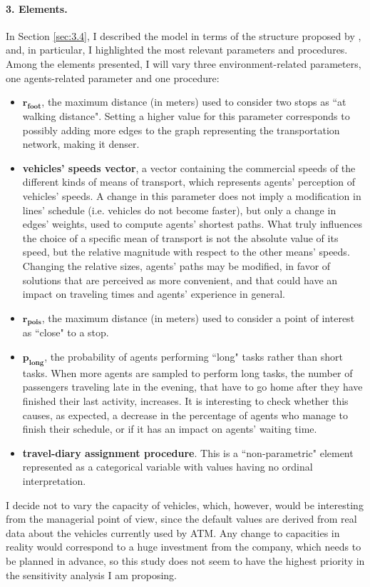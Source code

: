 \paragraph{3. Elements.}
In Section \ref{sec:3.4}, I described the model in terms of the structure proposed by \textcite{Borgonovo2022SensitivityAO}, and, in particular, I highlighted the most relevant parameters and procedures. Among the elements presented, I will vary three environment-related parameters, one agents-related parameter and one procedure:
\begin{itemize}
    \item $\mathbf{r_{foot}}$, the maximum distance (in meters) used to consider two stops as ``at walking distance". Setting a higher value for this parameter corresponds to possibly adding more edges to the graph representing the transportation network, making it denser.
    \item \textbf{vehicles' speeds vector}, a vector containing the commercial speeds of the different kinds of means of transport, which represents agents' perception of vehicles' speeds. A change in this parameter does not imply a modification in lines' schedule (i.e. vehicles do not become faster), but only a change in edges' weights, used to compute agents' shortest paths. What truly influences the choice of a specific mean of transport is not the absolute value of its speed, but the relative magnitude with respect to the other means' speeds. Changing the relative sizes, agents' paths may be modified, in favor of solutions that are perceived as more convenient, and that could have an impact on traveling times and agents' experience in general.
    \item $\mathbf{r_{pois}}$, the maximum distance (in meters) used to consider a point of interest as ``close" to a stop. 
    \item $\mathbf{p_{long}}$, the probability of agents performing ``long" tasks rather than short tasks. When more agents are sampled to perform long tasks, the number of passengers traveling late in the evening, that have to go home after they have finished their last activity, increases. It is interesting to check whether this causes, as expected, a decrease in the percentage of agents who manage to finish their schedule, or if it has an impact on agents' waiting time.
    \item \textbf{travel-diary assignment procedure}. This is a ``non-parametric" element represented as a categorical variable with values having no ordinal interpretation.
\end{itemize}
I decide not to vary the capacity of vehicles, which, however, would be interesting from the managerial point of view, since the default values are derived from real data about the vehicles currently used by ATM. Any change to capacities in reality would correspond to a huge investment from the company, which needs to be planned in advance, so this study does not seem to have the highest priority in the sensitivity analysis I am proposing.


